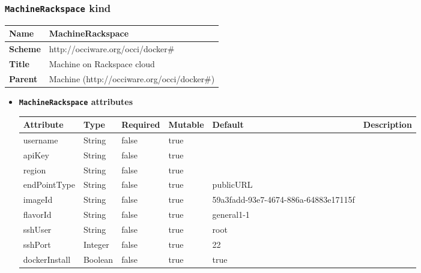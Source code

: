\subsubsection{\texttt{MachineRackspace} kind}
\begin{center}
\begin{tabular}{|l|l|}
  \hline
  \textbf{Name} & MachineRackspace \\
  \hline  
  \textbf{Scheme} & http://occiware.org/occi/docker\# \\
  \hline
  \textbf{Title} & Machine on Rackspace cloud \\
  \hline
  \textbf{Parent} & Machine (http://occiware.org/occi/docker\#) \\
  \hline
\end{tabular}
\end{center}
\begin{itemize}
\item \textbf{\texttt{MachineRackspace} attributes}

\begin{tabularx}{\textwidth}{|l|l|p{1.4cm}|p{1.3cm}|l|X|}
  \hline
  \textbf{Attribute} & \textbf{Type} & \textbf{Required} & \textbf{Mutable} & \textbf{Default} & \textbf{Description} \\
  \hline  
  username & String & false & true &  &  \\
  \hline
  apiKey & String & false & true &  &  \\
  \hline
  region & String & false & true &  &  \\
  \hline
  endPointType & String & false & true & publicURL &  \\
  \hline
  imageId & String & false & true & 59a3fadd-93e7-4674-886a-64883e17115f &  \\
  \hline
  flavorId & String & false & true & general1-1 &  \\
  \hline
  sshUser & String & false & true & root &  \\
  \hline
  sshPort & Integer & false & true & 22 &  \\
  \hline
  dockerInstall & Boolean & false & true & true &  \\
  \hline
\end{tabularx}
\end{itemize}



